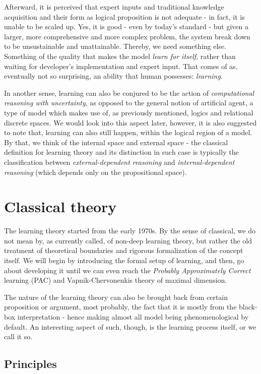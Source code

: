 Afterward, it is perceived that expert inputs and traditional knowledge acquisition and their form as logical proposition is not adequate - in fact, it is unable to be scaled up. Yes, it is good - even by today's standard - but given a larger, more comprehensive and more complex problem, the system break down to be unsustainable and unattainable. Thereby, we need something else. Something of the quality that makes the model \textit{learn for itself}, rather than waiting for developer's implementation and expert input. That comes of as, eventually not so surprising, an ability that human possesses: \textit{learning}. 

In another sense, learning can also be conjured to be the action of \textit{computational reasoning with uncertainty}, as opposed to the general notion of artificial agent, a type of model which makes use of, as previously mentioned, logics and relational discrete spaces. We would look into this aspect later, however, it is also suggested to note that, learning can also still happen, within the logical region of a model. By that, we think of the internal space and external space - the classical definition for learning theory and its distinction in such case is typically the classification between \textit{external-dependent reasoning} and \textit{internal-dependent reasoning} (which depends only on the propositional space). 

\section{Classical theory}

The learning theory started from the early 1970s. By the sense of classical, we do not mean by, as currently called, of non-deep learning theory, but rather the old treatment of theoretical boundaries and rigorous formalization of the concept itself. We will begin by introducing the formal setup of learning, and then, go about developing it until we can even reach the \textit{Probably Approximately Correct} learning (PAC) and Vapnik-Chervonenkis theory of maximal dimension. 

The nature of the learning theory can also be brought back from certain proposition or argument, most probably, the fact that it is mostly from the black-box interpretation - hence making almost all model being phenomenological by default. An interesting aspect of such, though, is the learning process itself, or we call it so. 
\subsection{Principles}

